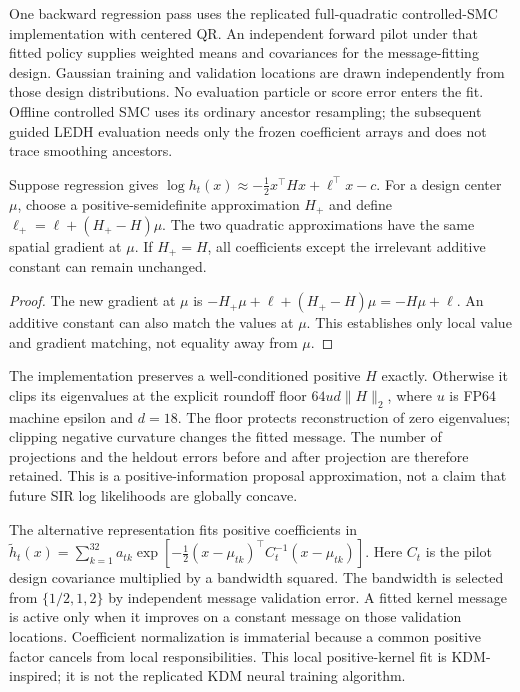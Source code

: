 One backward regression pass uses the replicated full-quadratic
controlled-SMC implementation with centered QR. An independent forward
pilot under that fitted policy supplies weighted means and covariances for
the message-fitting design. Gaussian training and validation locations are
drawn independently from those design distributions. No evaluation particle
or score error enters the fit. Offline controlled SMC uses its ordinary
ancestor resampling; the subsequent guided LEDH evaluation needs only the
frozen coefficient arrays and does not trace smoothing ancestors.

\begin{proposition}
\label{prop:bg-sir-information-projection}
Suppose regression gives $\log h_t(x)\approx
-\tfrac12x^\top Hx+\ell^\top x-c$. For a design center $\mu$, choose a
positive-semidefinite approximation $H_+$ and define
$\ell_+=\ell+(H_+-H)\mu$. The two quadratic approximations have the same
spatial gradient at $\mu$. If $H_+=H$, all coefficients except the
irrelevant additive constant can remain unchanged.
\end{proposition}
\begin{proof}
The new gradient at $\mu$ is
$-H_+\mu+\ell+(H_+-H)\mu=-H\mu+\ell$.
An additive constant can also match the values at $\mu$. This establishes
only local value and gradient matching, not equality away from $\mu$.
\end{proof}

The implementation preserves a well-conditioned positive $H$ exactly.
Otherwise it clips its eigenvalues at the explicit roundoff floor
$64u d\|H\|_2$, where $u$ is FP64 machine epsilon and $d=18$.
The floor protects reconstruction of zero eigenvalues; clipping negative
curvature changes the fitted message. The number of projections and the
heldout errors before and after projection are therefore retained.
This is a positive-information proposal approximation, not a claim that
future SIR log likelihoods are globally concave.

The alternative representation fits positive coefficients in
$\widetilde h_t(x)=\sum_{k=1}^{32}a_{tk}
\exp[-\tfrac12(x-\mu_{tk})^\top C_t^{-1}(x-\mu_{tk})]$.
Here $C_t$ is the pilot design covariance multiplied by a bandwidth squared.
The bandwidth is selected from $\{1/2,1,2\}$ by independent message
validation error. A fitted kernel message is active only when it improves
on a constant message on those validation locations. Coefficient
normalization is immaterial because a common positive factor cancels from
local responsibilities. This local positive-kernel fit is KDM-inspired;
it is not the replicated KDM neural training algorithm.

